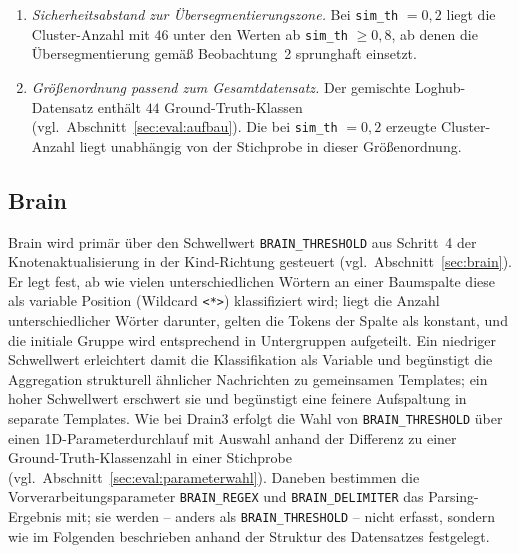 \begin{enumerate}
    \item \emph{Sicherheitsabstand zur Übersegmentierungszone.} Bei
    \texttt{sim\_th} $= 0{,}2$ liegt die Cluster-Anzahl mit $46$ unter den Werten ab \texttt{sim\_th} $\geq 0{,}8$, ab
    denen die Übersegmentierung gemäß Beobachtung~2 sprunghaft einsetzt.
    \item \emph{Größenordnung passend zum Gesamtdatensatz.} Der gemischte
    Loghub-Datensatz enthält $44$ Ground-Truth-Klassen
    (vgl.\ Abschnitt~\ref{sec:eval:aufbau}). Die bei \texttt{sim\_th} $= 0{,}2$
    erzeugte Cluster-Anzahl liegt unabhängig von der Stichprobe in dieser
    Größenordnung.
\end{enumerate}

\subsection{Brain}
\label{sec:eval:param:brain}

Brain wird primär über den Schwellwert \texttt{BRAIN\_THRESHOLD} aus
Schritt~4 der Knotenaktualisierung in der Kind-Richtung gesteuert (vgl.\
Abschnitt~\ref{sec:brain}). Er legt fest, ab wie vielen unterschiedlichen
Wörtern an einer Baumspalte diese als variable Position (Wildcard
\texttt{<*>}) klassifiziert wird; liegt die Anzahl unterschiedlicher Wörter
darunter, gelten die Tokens der Spalte als konstant, und die initiale Gruppe
wird entsprechend in Untergruppen aufgeteilt. Ein niedriger Schwellwert
erleichtert damit die Klassifikation als Variable und begünstigt die
Aggregation strukturell ähnlicher Nachrichten zu gemeinsamen Templates; ein
hoher Schwellwert erschwert sie und begünstigt eine feinere Aufspaltung in
separate Templates. Wie bei Drain3 erfolgt die Wahl von
\texttt{BRAIN\_THRESHOLD} über einen 1D-Parameterdurchlauf mit Auswahl anhand der
Differenz zu einer Ground-Truth-Klassenzahl in einer Stichprobe (vgl.\
Abschnitt~\ref{sec:eval:parameterwahl}). Daneben bestimmen die
Vorverarbeitungsparameter \texttt{BRAIN\_REGEX} und \texttt{BRAIN\_DELIMITER}
das Parsing-Ergebnis mit; sie werden -- anders als \texttt{BRAIN\_THRESHOLD}
-- nicht erfasst, sondern wie im Folgenden beschrieben anhand der Struktur
des Datensatzes festgelegt.

